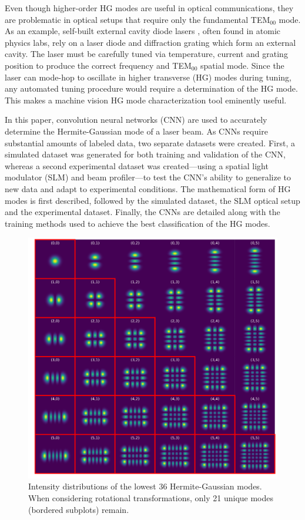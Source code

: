 \documentclass[10pt,journal,compsoc]{IEEEtran}
\begin{document}
Even though higher-order HG modes are useful in optical communications, they are problematic in optical setups that require only the fundamental TEM$_{00}$ \cite{ross2013laser} mode. As an example, self-built external cavity diode lasers \cite{macadam1992narrow}, often found in atomic physics labs, rely on a laser diode and diffraction grating which form an external cavity. The laser must be carefully tuned via temperature, current and grating position to produce the correct frequency and TEM$_{00}$ spatial mode. Since the laser can mode-hop to oscillate in higher transverse (HG) modes \cite{sivaprakasam1996mode, saliba2009mode} during tuning, any automated tuning procedure would require a determination of the HG mode. This makes a machine vision HG mode characterization tool eminently useful. 

In this paper, convolution neural networks (CNN) are used to accurately determine the Hermite-Gaussian mode of a laser beam. As CNNs require substantial amounts of labeled data, two separate datasets were created. First, a simulated dataset was generated for both training and validation of the CNN, whereas a second experimental dataset was created---using a spatial light modulator (SLM) and beam profiler---to test the CNN's ability to generalize to new data and adapt to experimental conditions. The mathematical form of HG modes is first described, followed by the simulated dataset, the SLM optical setup and the experimental dataset. Finally, the CNNs are detailed along with the training methods used to achieve the best classification of the HG modes.

\begin{figure}%
\centering %
\includegraphics[width=.5\textwidth]{example.pdf} %
\caption[Table of Contents Figure Caption]{Intensity distributions of the lowest 36 Hermite-Gaussian modes. When considering rotational transformations, only 21 unique modes (bordered subplots) remain.} %
\label{fig:modes} %
\end{figure}
\end{document}
